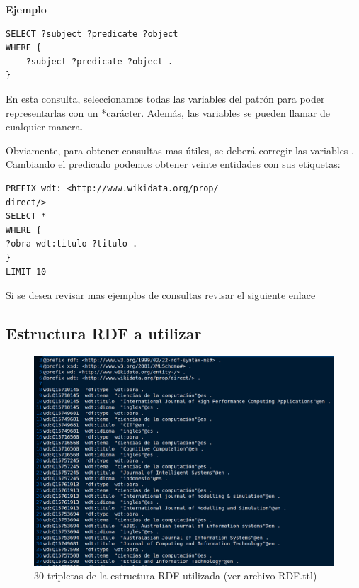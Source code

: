 \documentclass[conference]{IEEEtran}
\begin{document}
\textbf{Ejemplo}
\begin{lstlisting}[captionpos=b, caption=SPARQL query, label=lst:sparql,
basicstyle=\ttfamily,frame=single]
SELECT ?subject ?predicate ?object
WHERE {
	?subject ?predicate ?object .
}
\end{lstlisting}


En esta consulta, seleccionamos todas las variables del patrón para poder representarlas con un *carácter. Además, las variables se pueden llamar de cualquier manera.

Obviamente, para obtener consultas mas útiles, se deberá corregir las variables . Cambiando el predicado podemos obtener veinte entidades con sus etiquetas:


\begin{lstlisting}[captionpos=b, caption=SPARQL query, label=lst:sparql,
basicstyle=\ttfamily,frame=single]
PREFIX wdt: <http://www.wikidata.org/prop/
direct/> 
SELECT *
WHERE {
?obra wdt:titulo ?titulo . 
}
LIMIT 10
\end{lstlisting}
Si se desea revisar mas ejemplos de consultas revisar el siguiente enlace
\cite{b7}
\newpage
\subsection{Estructura RDF a utilizar}

\begin{figure}[h]
\includegraphics[scale=0.2]{imagenes/estruc_rdf_30.png} 
\caption{30 tripletas de la estructura RDF utilizada (ver archivo RDF.ttl) }
\end{figure} 
\end{document}
